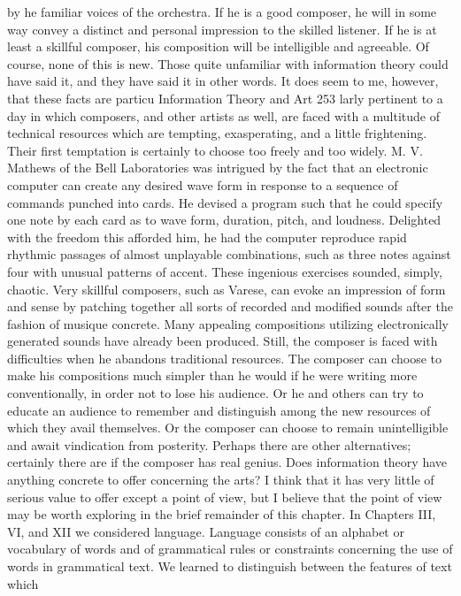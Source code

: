 {{{{{{{{{{{{by he familiar voices of the orchestra. If he is a good composer,
he will in some way convey a distinct and personal impression to
the skilled listener. If he is at least a skillful composer, his composition
will be intelligible and agreeable.
Of course, none of this is new. Those quite unfamiliar with
information theory could have said it, and they have said it in other
words. It does seem to me, however, that these facts are particu
Information Theory and Art
253
larly pertinent to a day in which composers, and other artists as
well, are faced with a multitude of technical resources which are
tempting, exasperating, and a little frightening.
Their first temptation is certainly to choose too freely and too
widely. M. V. Mathews of the Bell Laboratories was intrigued by
the fact that an electronic computer can create any desired wave
form in response to a sequence of commands punched into cards.
He devised a program such that he could specify one note by each
card as to wave form, duration, pitch, and loudness. Delighted
with the freedom this afforded him, he had the computer reproduce
rapid rhythmic passages of almost unplayable combinations, such
as three notes against four with unusual patterns of accent. These
ingenious exercises sounded, simply, chaotic.
Very skillful composers, such as Varese, can evoke an impression
of form and sense by patching together all sorts of recorded and
modified sounds after the fashion of musique concrete. Many
appealing compositions utilizing electronically generated sounds
have already been produced. Still, the composer is faced with
difficulties when he abandons traditional resources.
The composer can choose to make his compositions much
simpler than he would if he were writing more conventionally, in
order not to lose his audience. Or he and others can try to educate
an audience to remember and distinguish among the new resources
of which they avail themselves. Or the composer can choose to
remain unintelligible and await vindication from posterity. Perhaps
there are other alternatives; certainly there are if the composer has
real genius.
Does information theory have anything concrete to offer concerning
the arts? I think that it has very little of serious value to
offer except a point of view, but I believe that the point of view
may be worth exploring in the brief remainder of this chapter.
In Chapters III, VI, and XII we considered language. Language
consists of an alphabet or vocabulary of words and of grammatical
rules or constraints concerning the use of words in grammatical
text. We learned to distinguish between the features of text which
}}}}}}}}}}}}
